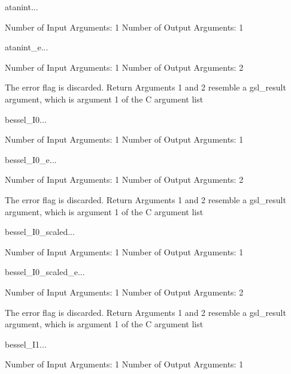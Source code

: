 \begin{funcdesc}{atanint}{...}

    Number of Input  Arguments:  1
    Number of Output Arguments:  1
\end{funcdesc}

\begin{funcdesc}{atanint_e}{...}

    Number of Input  Arguments:  1
    Number of Output Arguments:  2

The error flag is discarded.
Return Arguments 1 and 2 resemble a gsl_result argument,
	which is  argument 1 of the C argument list

\end{funcdesc}

\begin{funcdesc}{bessel_I0}{...}

    Number of Input  Arguments:  1
    Number of Output Arguments:  1
\end{funcdesc}

\begin{funcdesc}{bessel_I0_e}{...}

    Number of Input  Arguments:  1
    Number of Output Arguments:  2

The error flag is discarded.
Return Arguments 1 and 2 resemble a gsl_result argument,
	which is  argument 1 of the C argument list

\end{funcdesc}

\begin{funcdesc}{bessel_I0_scaled}{...}

    Number of Input  Arguments:  1
    Number of Output Arguments:  1
\end{funcdesc}

\begin{funcdesc}{bessel_I0_scaled_e}{...}

    Number of Input  Arguments:  1
    Number of Output Arguments:  2

The error flag is discarded.
Return Arguments 1 and 2 resemble a gsl_result argument,
	which is  argument 1 of the C argument list

\end{funcdesc}

\begin{funcdesc}{bessel_I1}{...}

    Number of Input  Arguments:  1
    Number of Output Arguments:  1
\end{funcdesc}

